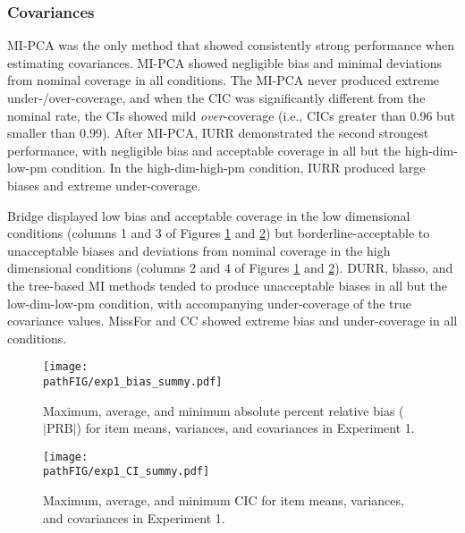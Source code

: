 	\subsubsection{Covariances}
	
	MI-PCA was the only method that showed consistently strong performance when estimating covariances. MI-PCA showed negligible bias and minimal deviations from nominal coverage in all conditions.
	The MI-PCA never produced extreme under-/over-coverage, and when the CIC was significantly different from the nominal rate, the CIs showed mild \emph{over}-coverage (i.e., CICs greater than 0.96 but smaller than 0.99). After MI-PCA, IURR demonstrated the second strongest performance, with negligible bias and acceptable coverage in all but the high-dim-low-pm 
	condition. In the high-dim-high-pm condition, IURR produced large biases and extreme under-coverage.
	
	Bridge displayed low bias and acceptable coverage in the low dimensional conditions (columns 1 and 3 of Figures \ref{fig:exp1bias} and \ref{fig:exp1cir}) but 
	borderline-acceptable to unacceptable biases and deviations from nominal coverage in the high dimensional conditions (columns 2 and 4 of Figures \ref{fig:exp1bias} and \ref{fig:exp1cir}).
	DURR, blasso, and the tree-based MI methods tended to produce unacceptable biases in all but the low-dim-low-pm condition, with accompanying under-coverage of the true covariance values. MissFor and CC showed extreme bias and under-coverage in all conditions.

\begin{figure}
\centering
\texttt{[image: \\pathFIG/exp1\_bias\_summy.pdf]}
\caption{\label{fig:exp1bias}
	Maximum, average, and minimum absolute percent relative bias ($|\text{PRB}|$) for item means, variances, 
	and covariances in Experiment 1.
	}
\end{figure}

\begin{figure}
\centering
\texttt{[image: \\pathFIG/exp1\_CI\_summy.pdf]}
\caption{\label{fig:exp1cir}
	Maximum, average, and minimum CIC for item means, variances, and covariances in Experiment 1.
	}
\end{figure}
	

